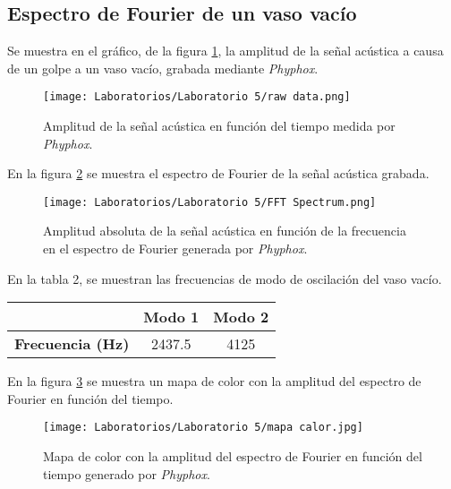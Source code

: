 \documentclass[letterpaper,11pt]{article} %
\begin{document}
\subsection{Espectro de Fourier de un vaso vacío}
Se muestra en el gráfico, de la figura \ref{grafico raw data}, la amplitud de la señal acústica a causa de un golpe a un vaso vacío, grabada mediante \textit{Phyphox}. 
\begin{figure}
    \centering
    \texttt{[image: Laboratorios/Laboratorio 5/raw data.png]}
    \caption{ Amplitud de la señal acústica
en función del tiempo medida por \textit{Phyphox}.}
    \label{grafico raw data}
\end{figure}
En la figura \ref{FFT } se muestra el espectro de Fourier de la señal acústica grabada.
\begin{figure}
    \centering
    \texttt{[image: Laboratorios/Laboratorio 5/FFT Spectrum.png]}
    \caption{Amplitud absoluta de la señal acústica en función de la frecuencia en el espectro de Fourier generada por \textit{Phyphox}.}
    \label{FFT }
\end{figure}
\begin{center}

En la tabla 2, se muestran las frecuencias de modo de oscilación del vaso vacío.
\begin{tabular}{|c|c|c|}
\hline
                         & \textbf{Modo 1} & \textbf{Modo 2} \\ \hline
\textbf{Frecuencia (Hz)} & 2437.5          & 4125            \\ \hline
\end{tabular}
\end{center}
En la figura \ref{ohhh que calor que calor oe eo ooooooo} se muestra un mapa de color con la amplitud del espectro de Fourier en función del tiempo.
\begin{figure}
    \centering
    \texttt{[image: Laboratorios/Laboratorio 5/mapa calor.jpg]}
    \caption{Mapa de color con la amplitud del espectro de Fourier en función del tiempo generado por \textit{Phyphox}.}
    \label{ohhh que calor que calor oe eo ooooooo}
\end{figure}
\end{document}
